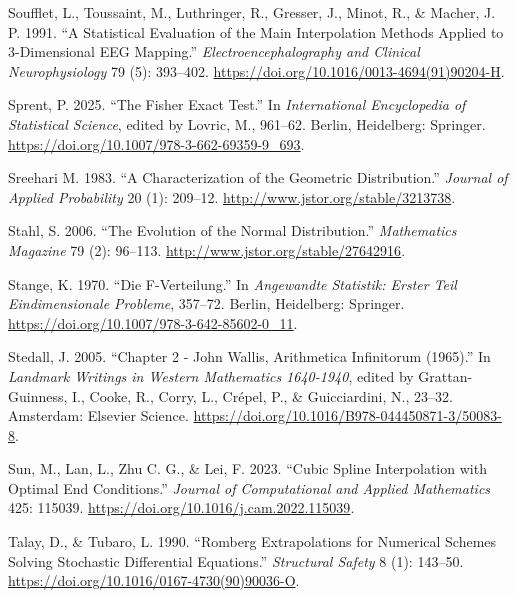 \documentclass[
]{article}
\newlength{\cslhangindent}
\newlength{\cslentryspacingunit} %
\newenvironment{CSLReferences}[2] %
 {%
  \setlength{\parindent}{0pt}
  \ifodd #1
  \let\oldpar\par
  \def\par{\hangindent=\cslhangindent\oldpar}
  \fi
  \setlength{\parskip}{#2\cslentryspacingunit}
 }%
 {}
\begin{document}
\begin{CSLReferences}{1}{0}
\leavevmode{}%
Soufflet, L., Toussaint, M., Luthringer, R., Gresser, J., Minot, R., \&
Macher, J. P. 1991. {``A Statistical Evaluation of the Main
Interpolation Methods Applied to 3-Dimensional EEG Mapping.''}
\emph{Electroencephalography and Clinical Neurophysiology} 79 (5):
393--402. \url{https://doi.org/10.1016/0013-4694(91)90204-H}.

\leavevmode{}%
Sprent, P. 2025. {``The Fisher Exact Test.''} In \emph{International
Encyclopedia of Statistical Science}, edited by Lovric, M., 961--62.
Berlin, Heidelberg: Springer.
\url{https://doi.org/10.1007/978-3-662-69359-9_693}.

\leavevmode{}%
Sreehari M. 1983. {``A Characterization of the Geometric
Distribution.''} \emph{Journal of Applied Probability} 20 (1): 209--12.
\url{http://www.jstor.org/stable/3213738}.

\leavevmode{}%
Stahl, S. 2006. {``The Evolution of the Normal Distribution.''}
\emph{Mathematics Magazine} 79 (2): 96--113.
\url{http://www.jstor.org/stable/27642916}.

\leavevmode{}%
Stange, K. 1970. {``{Die F-Verteilung}.''} In \emph{Angewandte
Statistik: Erster Teil Eindimensionale Probleme}, 357--72. Berlin,
Heidelberg: Springer.
\url{https://doi.org/10.1007/978-3-642-85602-0_11}.

\leavevmode{}%
Stedall, J. 2005. {``Chapter 2 - John Wallis, Arithmetica Infinitorum
(1965).''} In \emph{Landmark Writings in Western Mathematics 1640-1940},
edited by Grattan-Guinness, I., Cooke, R., Corry, L., Crépel, P., \&
Guicciardini, N., 23--32. Amsterdam: Elsevier Science.
\url{https://doi.org/10.1016/B978-044450871-3/50083-8}.

\leavevmode{}%
Sun, M., Lan, L., Zhu C. G., \& Lei, F. 2023. {``Cubic Spline
Interpolation with Optimal End Conditions.''} \emph{Journal of
Computational and Applied Mathematics} 425: 115039.
\url{https://doi.org/10.1016/j.cam.2022.115039}.

\leavevmode{}%
Talay, D., \& Tubaro, L. 1990. {``Romberg Extrapolations for Numerical
Schemes Solving Stochastic Differential Equations.''} \emph{Structural
Safety} 8 (1): 143--50.
\url{https://doi.org/10.1016/0167-4730(90)90036-O}.


\end{CSLReferences}
\end{document}
